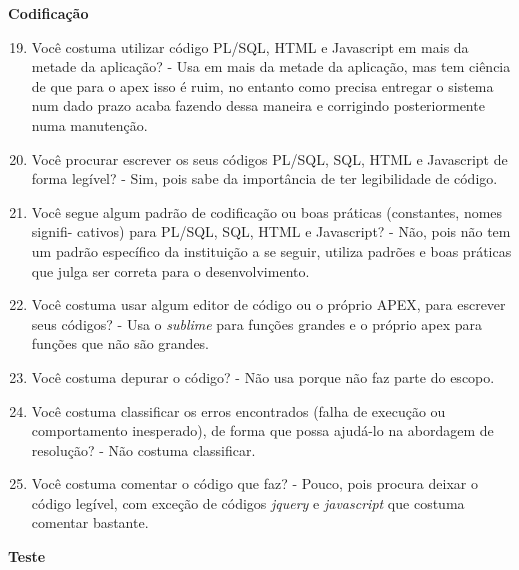 \begin{apendicesenv}
\textbf{Codificação}

\begin{enumerate}
	\setcounter{enumi}{18}
	\item Você costuma utilizar código PL/SQL, HTML e Javascript em mais da metade da
	aplicação?\newline
	- Usa em mais da metade da aplicação, mas tem ciência de que para o apex isso é ruim, no entanto como precisa entregar o sistema num dado prazo acaba fazendo dessa maneira e corrigindo posteriormente numa manutenção.
	\item Você procurar escrever os seus códigos PL/SQL, SQL, HTML e Javascript de forma
	legível?\newline
	- Sim, pois sabe da importância de ter legibilidade de código.
	\item Você segue algum padrão de codificação ou boas práticas (constantes, nomes signifi-
	cativos) para PL/SQL, SQL, HTML e Javascript?\newline
	- Não, pois não tem um padrão específico da instituição a se seguir, utiliza padrões e boas práticas que julga ser correta para o desenvolvimento.
	\item Você costuma usar algum editor de código ou o próprio APEX, para escrever seus
	códigos?\newline
	- Usa o \textit{sublime} para funções grandes e o próprio apex para funções que não são grandes.
	\item Você costuma depurar o código?\newline
	- Não usa porque não faz parte do escopo.
	\item Você costuma classificar os erros encontrados (falha de execução ou comportamento
	inesperado), de forma que possa ajudá-lo na abordagem de resolução?\newline
	- Não costuma classificar.
	\item Você costuma comentar o código que faz?\newline
	- Pouco, pois procura deixar o código legível, com exceção de códigos \textit{jquery} e \textit{javascript} que costuma comentar bastante.
\end{enumerate}

\textbf{Teste}


\end{apendicesenv}
